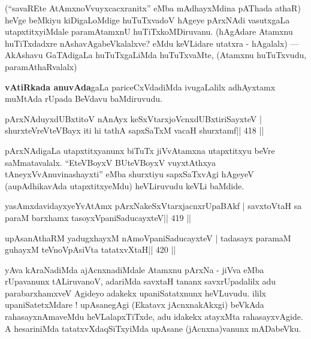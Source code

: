 \begin{artha}
(``savaREte AtAmxnoVvuyxcacxranitx'' eMba mAdhayxMdina pAThada athaR) 
heVge beMkiyu kiDigaLoMdige huTuTxvadoV hAgeye pArxNAdi vasutxgaLa 
utapxtitxyiMdale paramAtamxnU huTiTxkoMDiruvanu. (hAgAdare Atamxnu 
huTiTxdadxre nAshavAgabeVkalalxve? eMdu keVLidare utatxra - hAgalalx)  {\rm ---}  AkAshavu GaTAdigaLa huTuTxgaLiMda huTuTxvaMte, (Atamxnu huTuTxvudu, paramAthaRvalalx)
\end{artha}

\begin{artha}
{\bf vAtiRkada anuvAda}gaLa pariceCxVdadiMda ivugaLalilx adhAyxtamx muMtAda rUpada BeVdavu baMdiruvudu.
\end{artha}


\begin{shl}
pArxNAduyxdUBxtitoV nAnAyx keSxVtarxjoVcnxdUBxtiriSayxteV |
shurxteVreVteVBayx iti hi tathA sapxSaTxM vacaH shurxtamf\hfill || 418 ||
\end{shl}

\begin{artha}
pArxNAdigaLa utapxtitxyanunx biTuTx jiVvAtamxna utapxtitxyu beVre  saMmatavalalx. ``EteVBoyxV BUteVBoyxV vuyxtAthxya tAneyxVvAnuvinashayxti'' eMba shurxtiyu sapxSaTxvAgi hAgeyeV (aupAdhikavAda utapxtitxyeMdu) heVLiruvudu keVLi baMdide.
\end{artha}


\begin{shl}
yasAmxdavidayxyeYvA\s\s tAmx pArxNakeSxVtarxjacnxrUpaBAkf |
savxtoV\s taH sa paraM barxhamx tasoyxVpaniSaducayxteV\hfill || 419 ||
\end{shl}

\begin{shl}
upAsanAthaRM yadugxhayxM nAmoVpaniSaducayxteV |
tadasayx paramaM guhayxM teVnoVpAsiVta tatatxvXtaH\hfill || 420 ||
\end{shl}

\begin{artha}
yAva kAraNadiMda ajAcnxnadiMdale Atamxnu pArxNa - jiVva eMba   rUpavanunx tALiruvanoV, adariMda savxtaH tananx savxrUpadalilx adu  parabarxhamxveV Agideyo adakekx upaniSatatxnunx heVLuvudu. ililx  upaniSatetxMdare ! upAsanegAgi (Ekatavx jAcnxnakAkxgi) beVkAda rahasayxnAmaveMdu heVLalapxTiTxde, adu idakekx atayxMta rahasayxvAgide. A  hesariniMda tatatxvXdaqSiTxyiMda upAsane (jAcnxna)vanunx mADabeVku.
\end{artha}
